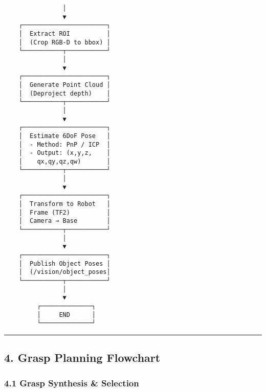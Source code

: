 \documentclass[
]{article}
\begin{document}
\begin{verbatim}
                │
                ▼
    ┌───────────────────────┐
    │  Extract ROI          │
    │  (Crop RGB-D to bbox) │
    └───────────┬───────────┘
                │
                ▼
    ┌───────────────────────┐
    │  Generate Point Cloud │
    │  (Deproject depth)    │
    └───────────┬───────────┘
                │
                ▼
    ┌───────────────────────┐
    │  Estimate 6DoF Pose   │
    │  - Method: PnP / ICP  │
    │  - Output: (x,y,z,    │
    │    qx,qy,qz,qw)       │
    └───────────┬───────────┘
                │
                ▼
    ┌───────────────────────┐
    │  Transform to Robot   │
    │  Frame (TF2)          │
    │  Camera → Base        │
    └───────────┬───────────┘
                │
                ▼
    ┌───────────────────────┐
    │  Publish Object Poses │
    │  (/vision/object_poses│
    └───────────┬───────────┘
                │
                ▼
         ┌──────────────┐
         │     END      │
         └──────────────┘
\end{verbatim}

\begin{center}\rule{0.5\linewidth}{0.5pt}\end{center}

\hypertarget{grasp-planning-flowchart}{%
\subsection{4. Grasp Planning
Flowchart}\label{grasp-planning-flowchart}}

\hypertarget{grasp-synthesis-selection}{%
\subsubsection{4.1 Grasp Synthesis \&
Selection}\label{grasp-synthesis-selection}}
\end{document}
